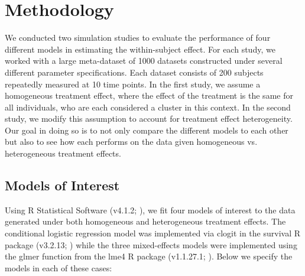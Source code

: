 \documentclass{article}
\begin{document}
    
\section{Methodology}
    We conducted two simulation studies to evaluate the performance of four different models in estimating the within-subject effect. For each study, we worked with a large meta-dataset of 1000 datasets constructed under several different parameter specifications. Each dataset consists of 200 subjects repeatedly measured at 10 time points. In the first study, we assume a homogeneous treatment effect, where the effect of the treatment is the same for all individuals, who are each considered a cluster in this context. In the second study, we modify this assumption to account for treatment effect heterogeneity. Our goal in doing so is to not only compare the different models to each other but also to see how each performs on the data given homogeneous vs. heterogeneous treatment effects. 
    \subsection{Models of Interest}
        Using R Statistical Software (v4.1.2; \citealt{r-main}), we fit four models of interest to the data generated under both homogeneous and heterogeneous treatment effects. The conditional logistic regression model was implemented via clogit in the survival R package (v3.2.13; \citealt{survival-package}) while the three mixed-effects models were implemented using the glmer function from the lme4 R package (v1.1.27.1; \citealt{lme4}). Below we specify the models in each of these cases:
        
\end{document}
